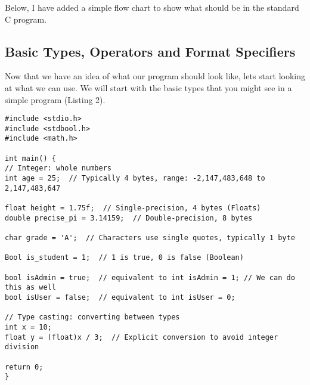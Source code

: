 \documentclass[a4paper,12pt]{article}
\begin{document}
Below, I have added a simple flow chart to show what should be in the standard C program. 

\hrulefill

\begin{center}
\end{center}

\subsection{Basic Types, Operators and Format Specifiers}

Now that we have an idea of what our program should look like, lets start looking at what we can use. We will start with the basic types that you might see in a simple program (Listing 2).

\lstset{language=C}
\begin{lstlisting}[caption=Basic types and type-casting]
#include <stdio.h>
#include <stdbool.h>
#include <math.h>
    
int main() {
// Integer: whole numbers
int age = 25;  // Typically 4 bytes, range: -2,147,483,648 to 2,147,483,647
    
float height = 1.75f;  // Single-precision, 4 bytes (Floats)
double precise_pi = 3.14159;  // Double-precision, 8 bytes
    
char grade = 'A';  // Characters use single quotes, typically 1 byte
    
Bool is_student = 1;  // 1 is true, 0 is false (Boolean)

bool isAdmin = true;  // equivalent to int isAdmin = 1; // We can do this as well
bool isUser = false;  // equivalent to int isUser = 0;
    
// Type casting: converting between types
int x = 10;
float y = (float)x / 3;  // Explicit conversion to avoid integer division
    
return 0;
}\end{lstlisting}
\end{document}
